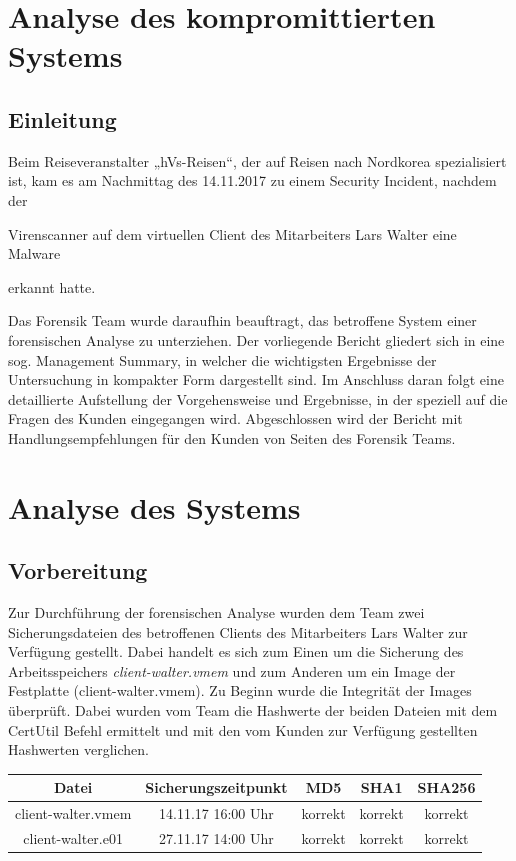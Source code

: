 \chapter{Analyse des kompromittierten Systems}

\section{Einleitung}
Beim  Reiseveranstalter „hVs-Reisen“, der auf Reisen nach Nordkorea spezialisiert ist, kam es am Nachmittag des 14.11.2017 zu einem Security Incident, nachdem der

Virenscanner auf dem virtuellen Client des Mitarbeiters Lars Walter eine Malware

erkannt hatte.

Das Forensik Team wurde daraufhin beauftragt, das betroffene System einer forensischen Analyse zu unterziehen. Der vorliegende Bericht gliedert sich in eine sog. Management Summary, in welcher die wichtigsten Ergebnisse der Untersuchung in kompakter Form dargestellt sind. Im Anschluss daran folgt eine detaillierte Aufstellung der Vorgehensweise und Ergebnisse, in der speziell auf die Fragen des Kunden eingegangen wird. Abgeschlossen wird der Bericht mit Handlungsempfehlungen für den Kunden von Seiten des Forensik Teams.

\chapter{Analyse des Systems}

\section{Vorbereitung}
Zur Durchführung der forensischen Analyse wurden dem Team zwei Sicherungsdateien des betroffenen Clients des Mitarbeiters Lars Walter zur Verfügung gestellt. Dabei handelt es sich zum Einen um die Sicherung des Arbeitsspeichers \textit{client-walter.vmem} und zum Anderen um ein Image der Festplatte (client-walter.vmem). 
Zu Beginn wurde die Integrität der Images überprüft. Dabei wurden vom Team die Hashwerte der beiden Dateien mit dem CertUtil Befehl ermittelt und mit den vom Kunden zur Verfügung gestellten Hashwerten verglichen.


\begin{center}
	\begin{tabular}{|c|c|c|c|c|} 
		\hline
		Datei & Sicherungszeitpunkt & MD5 & SHA1 & SHA256 \\ [0.5ex] 
		\hline
		client-walter.vmem & 14.11.17 16:00 Uhr & korrekt & korrekt & korrekt \\ 
		\hline
		client-walter.e01 & 27.11.17 14:00 Uhr & korrekt & korrekt & korrekt \\ 
		\hline
	\end{tabular}
\end{center}

